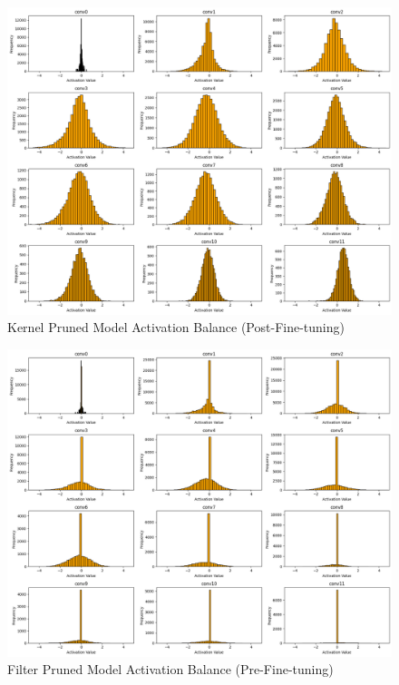 \documentclass[12pt]{article}
\begin{document}
\begin{figure}[h]
  \centering
  \includegraphics[width=1\linewidth]{report_images/kernel_act_ft.png}
  \caption{\label{fig:kernel_act_dist_ft}Kernel Pruned Model Activation Balance (Post-Fine-tuning)}
\end{figure}
\FloatBarrier

\begin{figure}[h]
  \centering
  \includegraphics[width=1\linewidth]{report_images/filter_act_pp.png}
  \caption{\label{fig:filter_act_dist_pp}Filter Pruned Model Activation Balance (Pre-Fine-tuning)}
\end{figure}
\FloatBarrier
\end{document}
